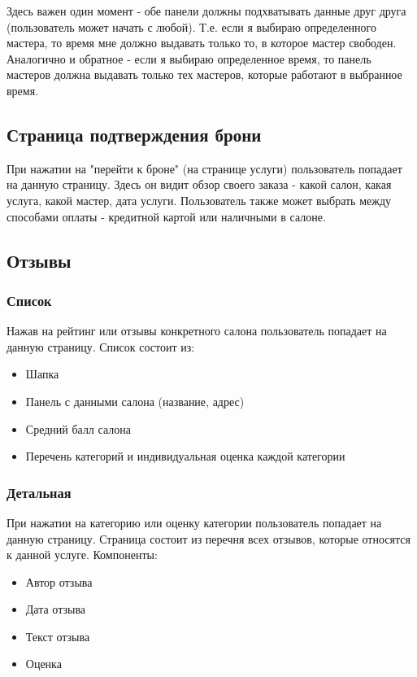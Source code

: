 \documentclass[DIV=calc, paper=a4, fontsize=11pt]{scrartcl} %
\begin{document}
Здесь важен один момент - обе панели должны подхватывать данные друг друга (пользователь может начать с любой). Т.е. если я выбираю определенного мастера, то время мне должно выдавать только то, в которое мастер свободен.
\\[0.5cm]
Аналогично и обратное - если я выбираю определенное время, то панель мастеров должна выдавать только тех мастеров, которые работают в выбранное время.

\subsection{Страница подтверждения брони}
При нажатии на "перейти к броне" (на странице услуги) пользователь попадает на данную страницу. Здесь он видит обзор своего заказа - какой салон, какая услуга, какой мастер, дата услуги. Пользователь также может выбрать между способами оплаты - кредитной картой или наличными в салоне.

\subsection{Отзывы}

\subsubsection{Список}

Нажав на рейтинг или отзывы конкретного салона пользователь попадает на данную страницу. Список состоит из:

\begin{itemize}
	\item Шапка
	\item Панель с данными салона (название, адрес)
	\item Средний балл салона
	\item Перечень категорий и индивидуальная оценка каждой категории
\end{itemize}

\subsubsection{Детальная}
При нажатии на категорию или оценку категории пользователь попадает на данную страницу. Страница состоит из перечня всех отзывов, которые относятся к данной услуге. Компоненты:

\begin{itemize}
	\item Автор отзыва
	\item Дата отзыва
	\item Текст отзыва
	\item Оценка 
\end{itemize}
\end{document}
